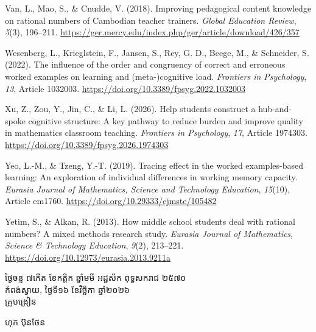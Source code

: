 \documentclass[a4paper,12pt]{article}
\begin{document}
{Van, L., Mao, S., \& Cnudde, V. (2018). Improving pedagogical content knowledge on rational numbers of Cambodian teacher trainers. \textit{Global Education Review}, \textit{5}(3), 196--211. \url{https://ger.mercy.edu/index.php/ger/article/download/426/357}

Wesenberg, L., Krieglstein, F., Jansen, S., Rey, G. D., Beege, M., \& Schneider, S. (2022). The influence of the order and congruency of correct and erroneous worked examples on learning and (meta-)cognitive load. \textit{Frontiers in Psychology}, \textit{13}, Article 1032003. \url{https://doi.org/10.3389/fpsyg.2022.1032003}

Xu, Z., Zou, Y., Jin, C., \& Li, L. (2026). Help students construct a hub-and-spoke cognitive structure: A key pathway to reduce burden and improve quality in mathematics classroom teaching. \textit{Frontiers in Psychology}, \textit{17}, Article 1974303. \url{https://doi.org/10.3389/fpsyg.2026.1974303}

Yeo, L.-M., \& Tzeng, Y.-T. (2019). Tracing effect in the worked examples-based learning: An exploration of individual differences in working memory capacity. \textit{Eurasia Journal of Mathematics, Science and Technology Education}, \textit{15}(10), Article em1760. \url{https://doi.org/10.29333/ejmste/105482}

Yetim, S., \& Alkan, R. (2013). How middle school students deal with rational numbers? A mixed methods research study. \textit{Eurasia Journal of Mathematics, Science \& Technology Education}, \textit{9}(2), 213--221. \url{https://doi.org/10.12973/eurasia.2013.9211a}
\par}

\vspace{12pt}
\Needspace{2.2cm}
\hfill
\begin{minipage}{9.8cm}
  {\centering
    ថ្ងៃចន្ទ ៧កើត ខែកត្តិក ឆ្នាំមមី អដ្ឋស័ក ពុទ្ធសករាជ ២៥៧០\\[2pt]
    កំពង់ស្វាយ, ថ្ងៃទី១៦ ខែវិច្ឆិកា ឆ្នាំ២០២៦\\[3pt]
    {\muol\fontsize{11.5pt}{16.5pt}\selectfont គ្រូបង្រៀន}\par}
  \vspace{32pt}
  \hfill{\muol\fontsize{11.5pt}{16.5pt}\selectfont ហុក ប៊ុនថែន}\hspace*{1.4cm}
\end{minipage}
\end{document}
